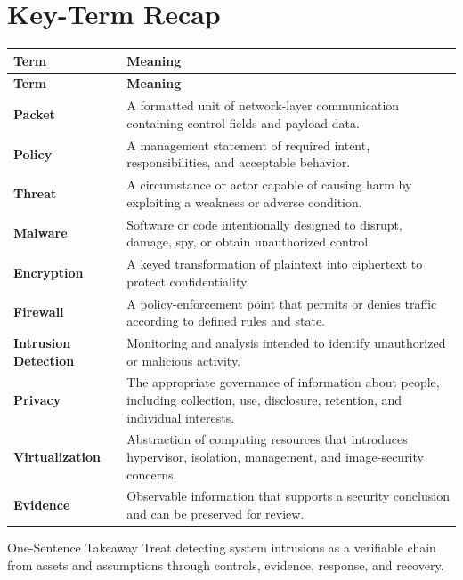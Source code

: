 \documentclass[11pt,letterpaper]{article}
\begin{document}
\section*{Key-Term Recap}
\begin{longtable}{>{\raggedright\arraybackslash}p{}>{\raggedright\arraybackslash}p{}}
\toprule\rowcolor{Navy}\color{white}\textbf{Term} & \color{white}\textbf{Meaning}\\\midrule
\endfirsthead
\toprule\rowcolor{Navy}\color{white}\textbf{Term} & \color{white}\textbf{Meaning}\\\midrule
\endhead
\textbf{Packet} & A formatted unit of network-layer communication containing control fields and payload data. \\\midrule
\textbf{Policy} & A management statement of required intent, responsibilities, and acceptable behavior. \\\midrule
\textbf{Threat} & A circumstance or actor capable of causing harm by exploiting a weakness or adverse condition. \\\midrule
\textbf{Malware} & Software or code intentionally designed to disrupt, damage, spy, or obtain unauthorized control. \\\midrule
\textbf{Encryption} & A keyed transformation of plaintext into ciphertext to protect confidentiality. \\\midrule
\textbf{Firewall} & A policy-enforcement point that permits or denies traffic according to defined rules and state. \\\midrule
\textbf{Intrusion Detection} & Monitoring and analysis intended to identify unauthorized or malicious activity. \\\midrule
\textbf{Privacy} & The appropriate governance of information about people, including collection, use, disclosure, retention, and individual interests. \\\midrule
\textbf{Virtualization} & Abstraction of computing resources that introduces hypervisor, isolation, management, and image-security concerns. \\\midrule
\textbf{Evidence} & Observable information that supports a security conclusion and can be preserved for review. \\\midrule
\bottomrule
\end{longtable}
\begin{CornellExamBox}{One-Sentence Takeaway}
Treat detecting system intrusions as a verifiable chain from assets and assumptions through controls, evidence, response, and recovery.
\end{CornellExamBox}
\end{document}
